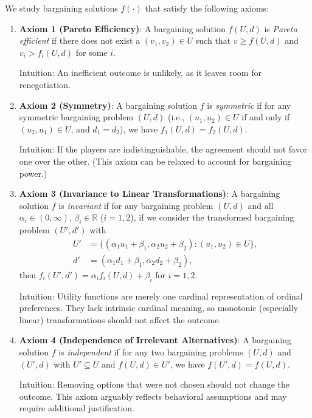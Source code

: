 \documentclass[11pt]{elegantbook_2}
\begin{document}
\begin{definition}[Axioms]
    We study bargaining solutions $f(\cdot)$ that satisfy the following axioms:
    \begin{enumerate}
        \item \textbf{Axiom 1 (Pareto Efficiency)}: A bargaining solution $f(U,d)$ is \textit{Pareto efficient} if there does not exist a $(v_1, v_2)\in U$ such that $v\geq f(U,d)$ and $v_i>f_i(U,d)$ for some $i$.
        \begin{note}
            Intuition: An inefficient outcome is unlikely, as it leaves room for renegotiation.
        \end{note}
        \item \textbf{Axiom 2 (Symmetry)}: A bargaining solution $f$ is \textit{symmetric} if for any symmetric bargaining problem $(U,d)$ (i.e., $(u_1,u_2)\in U$ if and only if $(u_2,u_1)\in U$, and $d_1=d_2$), we have $f_1(U,d)=f_2(U,d)$.
        \begin{note}
            Intuition: If the players are indistinguishable, the agreement should not favor one over the other. (This axiom can be relaxed to account for bargaining power.)
        \end{note}
        \item \textbf{Axiom 3 (Invariance to Linear Transformations)}: A bargaining solution $f$ is \textit{invariant} if for any bargaining problem $(U, d)$ and all $\alpha_i\in (0, \infty)$, $\beta_i\in \mathbb{R}$ ($i=1,2$), if we consider the transformed bargaining problem $(U',d')$ with
        \begin{equation}
            \begin{aligned}
                U'&=\{(\alpha_1u_1+\beta_1,\alpha_2u_2+\beta_2):(u_1,u_2)\in U\},\\
                d'&=\left(\alpha_1d_1+\beta_1,\alpha_2d_2+\beta_2\right),
            \end{aligned}
            \nonumber
        \end{equation}
        then $f_i(U',d')=\alpha_i f_i(U,d) + \beta_i$ for $i=1,2$.
        \begin{note}
            Intuition: Utility functions are merely one cardinal representation of ordinal preferences. They lack intrinsic cardinal meaning, so monotonic (especially linear) transformations should not affect the outcome.
        \end{note}
        \item \textbf{Axiom 4 (Independence of Irrelevant Alternatives)}: A bargaining solution $f$ is \textit{independent} if for any two bargaining problems $(U,d)$ and $(U',d)$ with $U'\subseteq U$ and $f(U,d)\in U'$, we have $f(U',d)=f(U,d)$.
        \begin{note}
            Intuition: Removing options that were not chosen should not change the outcome. This axiom arguably reflects behavioral assumptions and may require additional justification.
        \end{note}
    \end{enumerate}
\end{definition}
\end{document}
